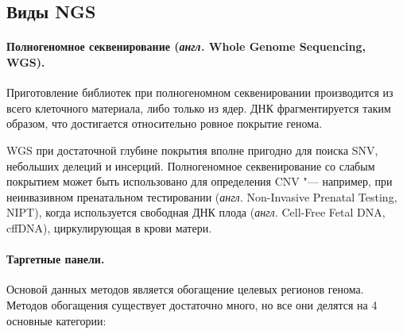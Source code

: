 \documentclass[a4paper,12pt]{article}
\begin{document}
\subsection{Виды NGS}

\paragraph{Полногеномное секвенирование (\textit{англ.} Whole Genome Sequencing, WGS).}
Приготовление библиотек при полногеномном секвенировании производится из всего клеточного материала, либо только из ядер.
ДНК фрагментируется таким образом, что достигается относительно ровное покрытие генома.

WGS при достаточной глубине покрытия вполне пригодно для поиска SNV, небольших делеций и инсерций.
Полногеномное секвенирование со слабым покрытием может быть использовано для определения CNV "--- например, при неинвазивном пренатальном тестировании (\textit{англ.} Non-Invasive Prenatal Testing, NIPT), когда используется свободная ДНК плода (\textit{англ.} Cell-Free Fetal DNA, cffDNA), циркулирующая в крови матери\cite{Yu_2019}.

\paragraph{Таргетные панели.}
Основой данных методов является обогащение целевых регионов генома.
Методов обогащения существует достаточно много, но все они делятся на 4 основные категории\cite{Teer_2010}:
\end{document}
